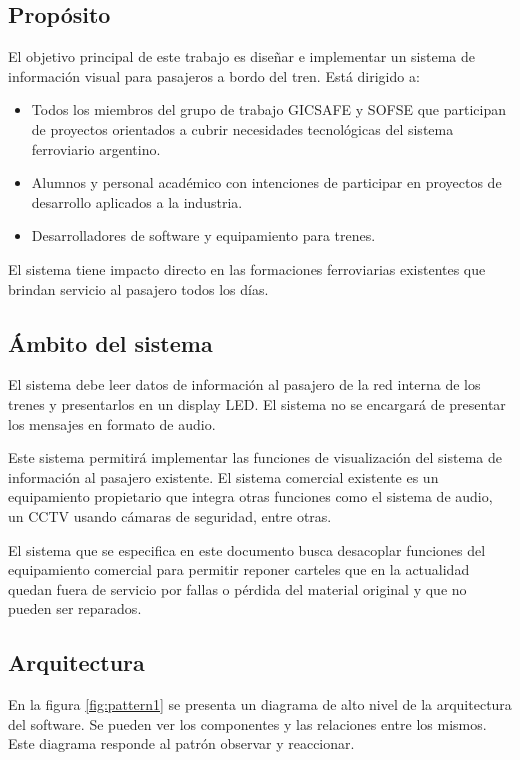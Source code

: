 \documentclass[
11pt, %
]{charter}
\begin{document}
\subsection{Propósito}
El objetivo principal de este trabajo es diseñar e implementar un sistema de información visual
para pasajeros a bordo del tren.
Está dirigido a:
\begin{itemize}
\item Todos los miembros del grupo de trabajo GICSAFE y SOFSE que participan de
proyectos orientados a cubrir necesidades tecnológicas del sistema ferroviario
argentino.
\item Alumnos y personal académico con intenciones de participar en proyectos de
desarrollo aplicados a la industria.
\item Desarrolladores de software y equipamiento para trenes.
\end{itemize}
El sistema tiene impacto directo en las formaciones ferroviarias existentes que brindan servicio al pasajero todos los días.

\subsection{Ámbito del sistema}
El sistema debe leer datos de información al pasajero de la red interna de los trenes y
presentarlos en un display LED. El sistema no se encargará de presentar los mensajes en
formato de audio.

Este sistema permitirá implementar las funciones de visualización del sistema de información al
pasajero existente. El sistema comercial existente es un equipamiento propietario que integra
otras funciones como el sistema de audio, un CCTV usando cámaras de seguridad, entre otras.

El sistema que se especifica en este documento busca desacoplar funciones del equipamiento
comercial para permitir reponer carteles que en la actualidad quedan fuera de servicio por fallas
o pérdida del material original y que no pueden ser reparados.
\subsection{Arquitectura}
En la figura \ref{fig:pattern1} se presenta un diagrama de alto nivel de la arquitectura del software. Se pueden
ver los componentes y las relaciones entre los mismos. Este diagrama responde al patrón
observar y reaccionar.
\end{document}

